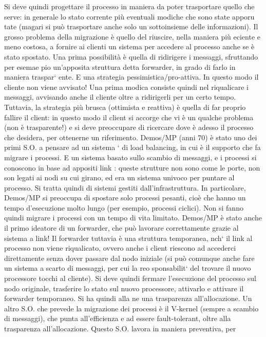 Si deve quindi progettare il processo in maniera da poter trasportare quello che
serve: in generale lo stato corrente più eventuali modiche che sono state apporu
tate (magari si può trasportare anche solo un sottoinsieme delle informazioni).
Il grosso problema della migrazione è quello del riuscire, nella maniera più
eciente e meno costosa, a fornire ai clienti un sistema per accedere al processo
anche se è stato spostato.
Una prima possibilità è quella di ridirigere i messaggi, sfruttando per esemae
pio un'apposita struttura detta forwarder, in grado di farlo in maniera traspar`
ente. E una strategia pessimistica/pro-attiva. In questo modo il cliente non
viene avvisato! Una prima modica consiste quindi nel riqualicare i messaggi,
avvisando anche il cliente oltre a ridirigerli per un certo tempo.
Tuttavia, la strategia più brusca (ottimista e reattiva) è quella di far proprio
fallire il client: in questo modo il client si accorge che vi è un qualche problema
(non è trasparente!) e si deve preoccupare di ricercare dove è adesso il processo
che desidera, per ottenerne un riferimento.
Demos/MP (anni 70) è stato uno dei primi S.O. a pensare ad un sistema
`
di load balancing, in cui è il supporto che fa migrare i processi. E un sistema
basato sullo scambio di messaggi, e i processi si conoscono in base ad appositi
link : queste strutture non sono come le porte, non son legati ai nodi su cui
girano, ed era un sistema univoco per puntare al processo. Si tratta quindi di
sistemi gestiti dall'infrastruttura.
In particolare, Demos/MP si preoccupa di spostare solo processi pesanti, cioè
che hanno un tempo d'esecuzione molto lungo (per esempio, processi ciclici).
Non si fanno quindi migrare i processi con un tempo di vita limitato.
Demos/MP è stato anche il primo ideatore di un forwarder, che può lavorare
correttamente grazie al sistema a link! Il forwarder tuttavia è una struttura
temporanea, nch` il link al processo non viene riqualicato, ovvero anche i
client riescono ad accederci direttamente senza dover passare dal nodo iniziale
(si può comunque anche fare un sistema a scarto di messaggi, per cui la reo
sponsabilit` del trovare il nuovo processore tocchi al cliente). Si deve quindi
fermare l'esecuzione del processo sul nodo originale, trasferire lo stato sul nuovo
processore, attivarlo e attivare il forwarder temporaneo. Si ha quindi alla ne
una trasparenza all'allocazione.
Un altro S.O. che prevede la migrazione dei processi è il V-kernel (sempre
a scambio di messaggi), che punta all'efficienza e ad essere fault-tolerant, oltre
alla trasparenza all'allocazione. Questo S.O. lavora in maniera preventiva, per

